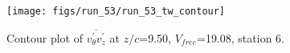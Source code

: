 \begin{figure}[H]
\centering
\texttt{[image: figs/run\_53/run\_53\_tw\_contour]}
\caption{Contour plot of $\overline{v_{\theta}^{\prime} v_{z}^{\prime}}$ at $z/c$=9.50, $V_{free}$=19.08, station 6.}
\label{fig:run_53_tw_contour}
\end{figure}


